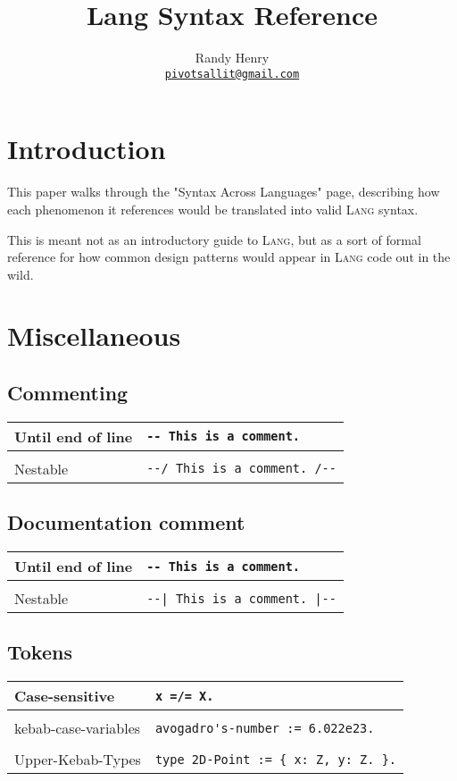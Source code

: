\documentclass[a4paper,12pt]{article}
\author{
        Randy Henry \\ 
        \href{mailto:pivotsallit@gmail.com}
        {{\small \texttt{pivotsallit@gmail.com}}}}
\title{Lang Syntax Reference}
\makeatletter
\newcommand{\code}{\lstinline}
\newcommand{\br}{\\ [0.5em] \hline \\ [-0.5em]}
\newenvironment{data}
    {
        \begin{center}
        \begin{tabular*}{\textwidth}{ l@{\extracolsep{\fill}}l }
    }
    {
        \end{tabular*}
        \end{center}
    }
\makeatother
\begin{document}
\maketitle
\tableofcontents

\newpage

\section{Introduction}
    This paper walks through the "Syntax Across Languages" \cite{SAL}
    page, describing how each phenomenon it references would be translated
    into valid \textsc{Lang} syntax.

    This is meant not as an introductory guide to \textsc{Lang}, but as a sort 
    of formal reference for how common design patterns would appear 
    in \textsc{Lang} code out in the wild.


\section{Miscellaneous} 
\subsection{Commenting}
    \begin{data}
        Until end of line & 
            \code|-- This is a comment.| \br
        Nestable          & 
            \code$--/ This is a comment. /--$
    \end{data}

\subsection{Documentation comment}
    \begin{data}
        Until end of line & 
            \code|-- This is a comment.| \br
        Nestable          & 
            \code$--| This is a comment. |--$
    \end{data}

\subsection{Tokens}
    \begin{data}
        Case-sensitive       & 
            \code|x =/= X.| \br
        kebab-case-variables & 
            \code|avogadro's-number := 6.022e23.| \br
        Upper-Kebab-Types    & 
            \code|type 2D-Point := { x: Z, y: Z. }.|
    \end{data}
    
\end{document}
